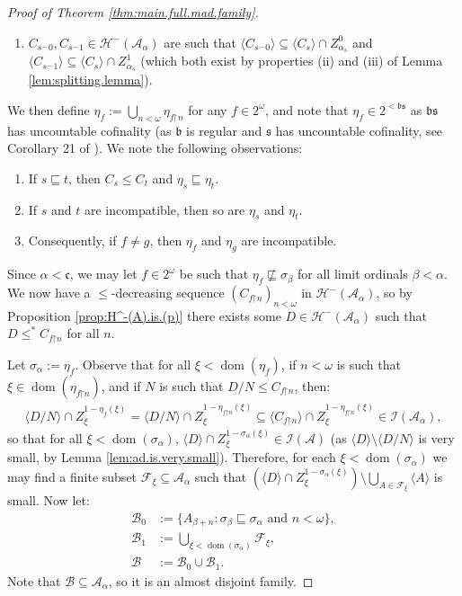 \documentclass[11pt,reqno]{amsart}
\theoremstyle{plain}
\numberwithin{equation}{section}
\theoremstyle{definition}
\newcommand{\func}{\operatorname}
\renewcommand{\c}[1]{\langle #1 \rangle}
\newcommand{\bb}[1]{\left( #1 \right)}
\newcommand{\F}{\cal{F}}
\newcommand{\cal}{\mathcal}
\renewcommand{\frak}{\mathfrak}
\newcommand{\dom}{\func{dom}}
\newcommand{\A}{\cal{A}}
\newcommand{\B}{\cal{B}}
\newcommand{\restrictedto}{\mathord{\upharpoonright}}
\renewcommand{\H}{\cal{H}}
\newcommand{\I}{\cal{I}}
\begin{document}
\begin{proof}[Proof of Theorem \ref{thm:main.full.mad.family}]
\begin{enumerate}
        \item $C_{s^\frown0},C_{s^\frown1} \in \H^-(\A_\alpha)$ are such that $\c{C_{s^\frown0}} \subseteq \c{C_s} \cap Z_{\alpha_s}^0$ and $\c{C_{s^\frown1}} \subseteq \c{C_s} \cap Z_{\alpha_s}^1$ (which both exist by properties (ii) and (iii) of Lemma \ref{lem:splitting.lemma}).
    \end{enumerate}
    We then define $\eta_f := \bigcup_{n<\omega} \eta_{f\restrictedto n}$ for any $f \in 2^\omega$, and note that $\eta_f \in 2^{<\frak{bs}}$ as $\frak{bs}$ has uncountable cofinality (as $\frak{b}$ is regular and $\frak{s}$ has uncountable cofinality, see Corollary 21 of \cite{G21}). We note the following observations:
    \begin{enumerate}
        \item If $s \sqsubseteq t$, then $C_s \leq C_t$ and $\eta_s \sqsubseteq \eta_t$.

        \item If $s$ and $t$ are incompatible, then so are $\eta_s$ and $\eta_t$.

        \item Consequently, if $f \neq g$, then $\eta_f$ and $\eta_g$ are incompatible.
    \end{enumerate}
    Since $\alpha < \frak{c}$, we may let $f \in 2^\omega$ be such that $\eta_f \not\sqsubseteq \sigma_\beta$ for all limit ordinals $\beta < \alpha$. We now have a $\leq$-decreasing sequence $(C_{f\restrictedto n})_{n<\omega}$ in $\H^-(\A_\alpha)$, so by Proposition \ref{prop:H^-(A).is.(p)} there exists some $D \in \H^-(\A_\alpha)$ such that $D \leq^* C_{f\restrictedto n}$ for all $n$.

    Let $\sigma_{\alpha} := \eta_f$. Observe that for all $\xi < \dom(\eta_f)$, if $n < \omega$ is such that $\xi \in \dom(\eta_{f\restrictedto n})$, and if $N$ is such that $D/N \leq C_{f\restrictedto n}$, then:
    \begin{align*}
        \c{D/N} \cap Z_\xi^{1-\eta_f(\xi)} = \c{D/N} \cap Z_\xi^{1-\eta_{f\restrictedto n}(\xi)} \subseteq \c{C_{f\restrictedto n}} \cap Z_\xi^{1-\eta_{f\restrictedto n}(\xi)} \in \I(\A_\alpha),
    \end{align*}
    so that for all $\xi < \dom(\sigma_{\alpha})$, $\c{D} \cap Z_\xi^{1-\sigma_\alpha(\xi)} \in \I(\A)$ (as $\c{D} \setminus \c{D/N}$ is very small, by Lemma \ref{lem:ad.is.very.small}). Therefore, for each $\xi < \dom(\sigma_\alpha)$ we may find a finite subset $\F_\xi \subseteq \A_\alpha$ such that $\bb{\c{D} \cap Z_\xi^{1-\sigma_\alpha(\xi)}} \setminus \bigcup_{A \in \F_\xi} \c{A}$ is small. Now let:
    \begin{align*}
        \B_0 &:= \{A_{\beta+n} : \sigma_\beta \sqsubseteq \sigma_\alpha \text{ and } n < \omega\}, \\
        \B_1 &:= \bigcup_{\xi < \dom(\sigma_\alpha)} \F_\xi, \\
        \B &:= \B_0 \cup \B_1.
    \end{align*}
    Note that $\B \subseteq \A_\alpha$, so it is an almost disjoint family.


\end{proof}
\end{document}
